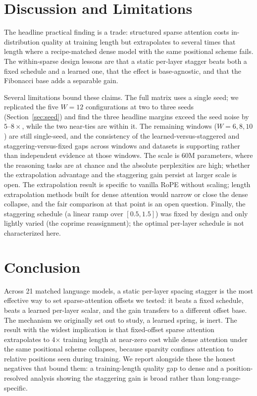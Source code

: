 \documentclass[11pt]{article}
\begin{document}
\section{Discussion and Limitations}

The headline practical finding is a trade: structured sparse attention costs
in-distribution quality at training length but extrapolates to several times that
length where a recipe-matched dense model with the same positional scheme fails.
The within-sparse design lessons are that a static per-layer stagger beats both a
fixed schedule and a learned one, that the effect is base-agnostic, and that the
Fibonacci base adds a separable gain.

Several limitations bound these claims. The full matrix uses a single seed; we
replicated the five $W{=}12$ configurations at two to three seeds
(Section~\ref{sec:seed}) and find the three headline margins exceed the seed
noise by $5$--$8\times$, while the two near-ties are within it. The remaining
windows ($W{=}6,8,10$) are still single-seed, and the consistency of the
learned-versus-staggered and staggering-versus-fixed gaps across windows and
datasets is supporting rather than independent evidence at those windows. The
scale is 60M parameters, where the reasoning
tasks are at chance and the absolute perplexities are high; whether the
extrapolation advantage and the staggering gain persist at larger scale is open.
The extrapolation result is specific to vanilla RoPE without scaling; length
extrapolation methods built for dense attention would narrow or close the dense
collapse, and the fair comparison at that point is an open question. Finally, the
staggering schedule (a linear ramp over $[0.5,1.5]$) was fixed by design and only
lightly varied (the coprime reassignment); the optimal per-layer schedule is not
characterized here.

\section{Conclusion}

Across 21 matched language models, a static per-layer spacing stagger is the most
effective way to set sparse-attention offsets we tested: it beats a fixed
schedule, beats a learned per-layer scalar, and the gain transfers to a different
offset base. The mechanism we originally set out to study, a learned spring, is
inert. The result with the widest implication is that fixed-offset sparse
attention extrapolates to 4$\times$ training length at near-zero cost while dense
attention under the same positional scheme collapses, because sparsity confines
attention to relative positions seen during training. We report alongside these
the honest negatives that bound them: a training-length quality gap to dense and a
position-resolved analysis showing the staggering gain is broad rather than
long-range-specific.
\end{document}
